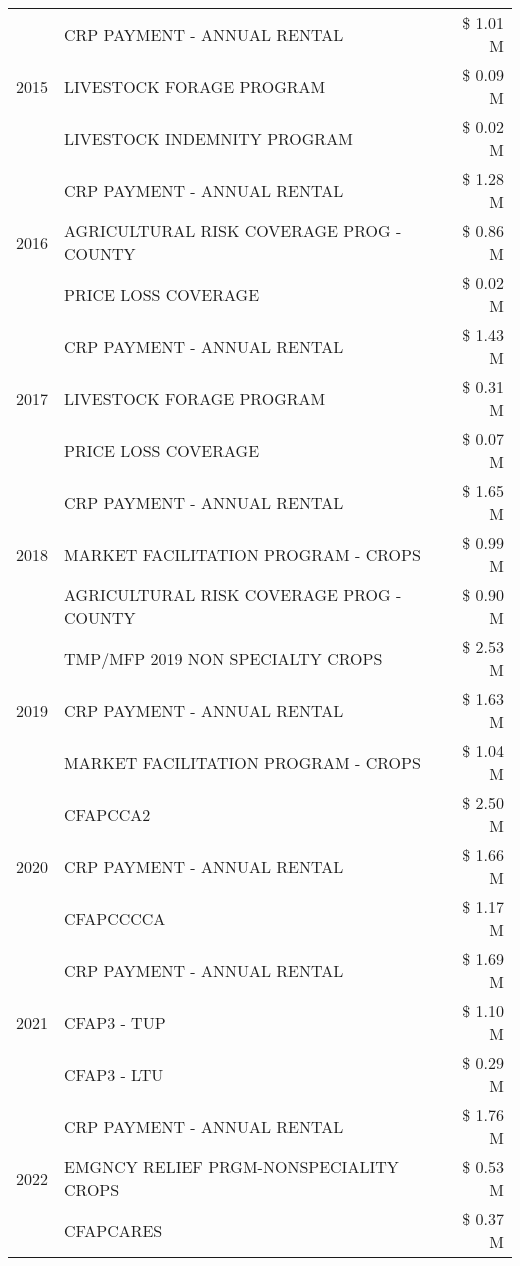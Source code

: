 \begin{tabular}{llr}
\cline{1-3}
\multirow[t]{3}{*}{2015} & CRP PAYMENT - ANNUAL RENTAL & \$ 1.01 M \\
 & LIVESTOCK FORAGE PROGRAM & \$ 0.09 M \\
 & LIVESTOCK INDEMNITY PROGRAM & \$ 0.02 M \\
\cline{1-3}
\multirow[t]{3}{*}{2016} & CRP PAYMENT - ANNUAL RENTAL & \$ 1.28 M \\
 & AGRICULTURAL RISK COVERAGE PROG - COUNTY & \$ 0.86 M \\
 & PRICE LOSS COVERAGE & \$ 0.02 M \\
\cline{1-3}
\multirow[t]{3}{*}{2017} & CRP PAYMENT - ANNUAL RENTAL & \$ 1.43 M \\
 & LIVESTOCK FORAGE PROGRAM & \$ 0.31 M \\
 & PRICE LOSS COVERAGE & \$ 0.07 M \\
\cline{1-3}
\multirow[t]{3}{*}{2018} & CRP PAYMENT - ANNUAL RENTAL & \$ 1.65 M \\
 & MARKET FACILITATION PROGRAM - CROPS & \$ 0.99 M \\
 & AGRICULTURAL RISK COVERAGE PROG - COUNTY & \$ 0.90 M \\
\cline{1-3}
\multirow[t]{3}{*}{2019} & TMP/MFP 2019 NON SPECIALTY CROPS & \$ 2.53 M \\
 & CRP PAYMENT - ANNUAL RENTAL & \$ 1.63 M \\
 & MARKET FACILITATION PROGRAM - CROPS & \$ 1.04 M \\
\cline{1-3}
\multirow[t]{3}{*}{2020} & CFAPCCA2 & \$ 2.50 M \\
 & CRP PAYMENT - ANNUAL RENTAL & \$ 1.66 M \\
 & CFAPCCCCA & \$ 1.17 M \\
\cline{1-3}
\multirow[t]{3}{*}{2021} & CRP PAYMENT - ANNUAL RENTAL & \$ 1.69 M \\
 & CFAP3 - TUP & \$ 1.10 M \\
 & CFAP3 - LTU & \$ 0.29 M \\
\cline{1-3}
\multirow[t]{3}{*}{2022} & CRP PAYMENT - ANNUAL RENTAL & \$ 1.76 M \\
 & EMGNCY RELIEF PRGM-NONSPECIALITY CROPS & \$ 0.53 M \\
 & CFAPCARES & \$ 0.37 M \\
\cline{1-3}
\bottomrule
\end{tabular}
